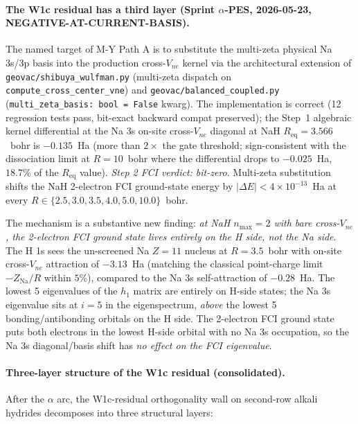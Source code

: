 \documentclass[aps,pra,twocolumn,superscriptaddress,longbibliography]{revtex4-2}
\begin{document}
\paragraph{The W1c residual has a third layer (Sprint $\alpha$-PES,
2026-05-23, NEGATIVE-AT-CURRENT-BASIS).}
The named target of M-Y Path A is to substitute the multi-zeta
physical Na 3s/3p basis into the production cross-$V_{ne}$ kernel via
the architectural extension of \texttt{geovac/shibuya\_wulfman.py}
(multi-zeta dispatch on \texttt{compute\_cross\_center\_vne}) and
\texttt{geovac/balanced\_coupled.py} (\texttt{multi\_zeta\_basis: bool
= False} kwarg).  The implementation is correct
(12 regression tests pass, bit-exact backward compat preserved); the
Step~1 algebraic kernel differential at the Na 3s on-site cross-$V_{ne}$
diagonal at NaH $R_\text{eq} = 3.566$~bohr is $-0.135$~Ha (more than
$2\times$ the gate threshold; sign-consistent with the dissociation
limit at $R = 10$~bohr where the differential drops to
$-0.025$~Ha, $18.7\%$ of the $R_\text{eq}$ value).
\emph{Step 2 FCI verdict: bit-zero}.  Multi-zeta substitution shifts
the NaH 2-electron FCI ground-state energy by
$|\Delta E| < 4 \times 10^{-13}$~Ha at every $R \in \{2.5, 3.0, 3.5,
4.0, 5.0, 10.0\}$~bohr.

The mechanism is a substantive new finding: \emph{at NaH $n_{\max}=2$
with bare cross-$V_{ne}$, the 2-electron FCI ground state lives
entirely on the H side, not the Na side}.  The H 1s sees the
un-screened Na $Z=11$ nucleus at $R = 3.5$~bohr with on-site
cross-$V_{ne}$ attraction of $-3.13$~Ha (matching the classical
point-charge limit $-Z_\text{Na}/R$ within $5\%$), compared to
the Na 3s self-attraction of $-0.28$~Ha.  The lowest 5 eigenvalues
of the $h_1$ matrix are entirely on H-side states; the Na 3s
eigenvalue sits at $i = 5$ in the eigenspectrum, \emph{above} the
lowest 5 bonding/antibonding orbitals on the H side.  The
2-electron FCI ground state puts both electrons in the lowest H-side
orbital with no Na 3s occupation, so the Na 3s diagonal/basis shift
has \emph{no effect on the FCI eigenvalue}.

\paragraph{Three-layer structure of the W1c residual (consolidated).}
After the $\alpha$ arc, the W1c-residual orthogonality wall on
second-row alkali hydrides decomposes into three structural layers:
\end{document}
